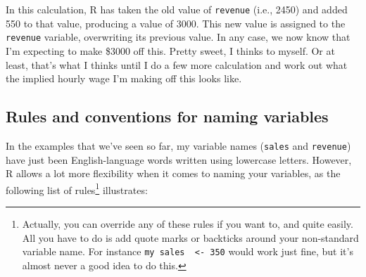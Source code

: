 \documentclass[
]{book}
\begin{document}
In this calculation, R has taken the old value of \texttt{revenue} (i.e., 2450) and added 550 to that value, producing a value of 3000. This new value is assigned to the \texttt{revenue} variable, overwriting its previous value. In any case, we now know that I'm expecting to make \$3000 off this. Pretty sweet, I thinks to myself. Or at least, that's what I thinks until I do a few more calculation and work out what the implied hourly wage I'm making off this looks like.

\hypertarget{rules-and-conventions-for-naming-variables}{%
\subsection{Rules and conventions for naming variables}\label{rules-and-conventions-for-naming-variables}}

In the examples that we've seen so far, my variable names (\texttt{sales} and \texttt{revenue}) have just been English-language words written using lowercase letters. However, R allows a lot more flexibility when it comes to naming your variables, as the following list of rules\footnote{Actually, you can override any of these rules if you want to, and quite easily. All you have to do is add quote marks or backticks around your non-standard variable name. For instance \texttt{\textasciigrave{}my\ sales\ \textasciigrave{}\ \textless{}-\ 350} would work just fine, but it's almost never a good idea to do this.} illustrates:
\end{document}
